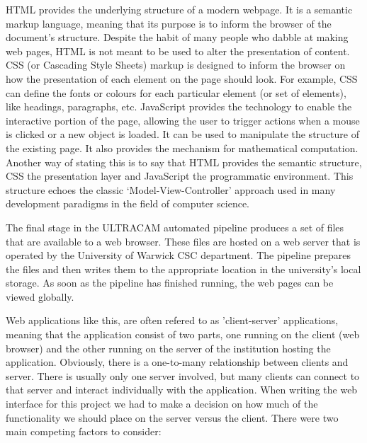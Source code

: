 HTML provides the underlying structure of a modern webpage. It is a semantic markup language, meaning that its purpose is to inform the browser of the document's structure. Despite the habit of many people who dabble at making web pages, HTML is not meant to be used to alter the presentation of content. CSS (or Cascading Style Sheets) markup is designed to inform the browser on how the presentation of each element on the page should look. For example, CSS can define the fonts or colours for each particular element (or set of elements), like headings, paragraphs, etc. JavaScript provides the technology to enable the interactive portion of the page, allowing the user to trigger actions when a mouse is clicked or a new object is loaded. It can be used to manipulate the structure of the existing page. It also provides the mechanism for mathematical computation. Another way of stating this is to say that HTML provides the semantic structure, CSS the presentation layer and JavaScript the programmatic environment. This structure echoes the classic `Model-View-Controller' approach used in many development paradigms in the field of computer science.

The final stage in the ULTRACAM automated pipeline produces a set of files that are available to a web browser. These files are hosted on a web server that is operated by the University of Warwick CSC department. The pipeline prepares the files and then writes them to the appropriate location in the university's local storage. As soon as the pipeline has finished running, the web pages can be viewed globally. 

\label{sect:clientserver}
Web applications like this, are often refered to as 'client-server' applications, meaning that the application consist of two parts, one running on the client (web browser) and the other running on the server of the institution hosting the application. Obviously, there is a one-to-many relationship between clients and server. There is usually only one server involved, but many clients can connect to that server and interact individually with the application. When writing the web interface for this project we had to make a decision on how much of the functionality we should place on the server versus the client. There were two main competing factors to consider:

